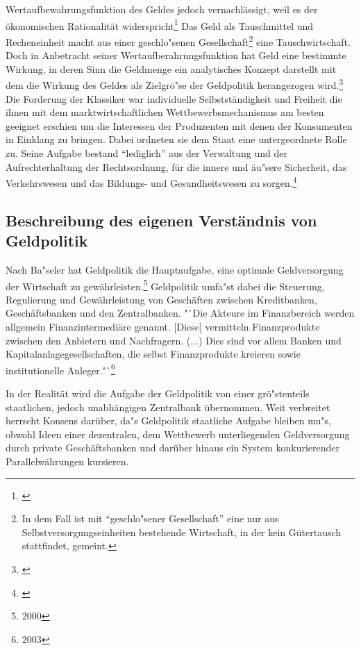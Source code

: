 \documentclass[
        onecolumn,
        a4paper,
        abstracton,
        parskip=half
        ,final
        ]{scrartcl}
\begin{document}
Wertaufbewahrungsfunktion des Geldes jedoch vernachl{\"a}ssigt, weil es der {\"o}konomischen Rationalit{\"a}t widerspricht\footnote[17]{\citep*[S.53]{bombach1981theorie}} Das Geld als Tauschmittel und Recheneinheit macht aus einer geschlo{"s}enen Gesellschaft\footnote[18]{In dem Fall ist mit "`geschlo{"s}ener Gesellschaft"' eine nur aus Selbstversorgungseinheiten bestehende Wirtschaft, in der kein G{\"u}tertausch stattfindet, gemeint.} eine Tauschwirtschaft. Doch in Anbetracht seiner Wertaufberahrungsfunktion hat Geld eine bestimmte Wirkung, in deren Sinn die Geldmenge ein analytisches Konzept darstellt mit dem die Wirkung des Geldes als Zielgr{\"o}{"s}e der Geldpolitik herangezogen wird.\footnote[19]{\citep*[S.421]{Basseler2010}} Die Forderung der Klassiker war individuelle Selbstst{\"a}ndigkeit und Freiheit die ihnen mit dem marktwirtschaftlichen Wettbewerbsmechanismus am besten geeignet erschien um die Interessen der Produzenten mit denen der Konsumenten in Einklang zu bringen. Dabei ordneten sie dem Staat eine untergeordnete Rolle zu. Seine Aufgabe bestand "`lediglich"' aus der Verwaltung und der Aufrechterhaltung der Rechtsordnung, f{\"u}r die innere und {\"a}u{"s}ere Sicherheit, das Verkehrswesen und das Bildungs- und Gesundheitswesen zu sorgen.\footnote[20]{\citep*[S.60f]{Basseler2010}}


\subsection{Beschreibung des eigenen Verst{\"a}ndnis von Geldpolitik}

Nach Ba{"s}eler hat Geldpolitik die Hauptaufgabe, eine optimale Geldversorgung der Wirtschaft zu gew{\"a}hrleisten.\footnote{2000}{\citep*[vgl.][S. 551]{Basseler2010}}
Geldpolitik umfa{"s}t dabei die Steuerung, Regulierung und Gew{\"a}hrleistung von Gesch{\"a}ften zwischen Kreditbanken, Gesch{\"a}ftsbanken und den Zentralbanken.
 "`Die Akteure im Finanzbereich werden allgemein Finanzintermedi{\"a}re genannt. [Diese] vermitteln Finanzprodukte zwischen den Anbietern und Nachfragern. (...) Dies sind vor allem Banken und Kapitalanlagegesellschaften, die selbst Finanzprodukte kreieren sowie institutionelle Anleger."`\footnote{2003}{\citep*[vgl.][S.511f]{Basseler2010}}

In der Realit{\"a}t wird die Aufgabe der Geldpolitik von einer gr{\"o}{"s}tenteils staatlichen, jedoch unabh{\"a}ngigen Zentralbank {\"u}bernommen. Weit verbreitet herrscht Konsens dar{\"u}ber, da{"s} Geldpolitik staatliche Aufgabe bleiben mu{"s}, obwohl Ideen einer dezentralen, dem Wettbewerb unterliegenden Geldversorgung durch private Gesch{\"a}ftsbanken und dar{\"u}ber hinaus ein System konkurierender Parallelw{\"a}hrungen kursieren. 
\end{document}
